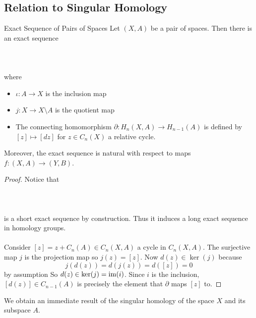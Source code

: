 \documentclass[a4paper]{article}
\begin{document}
\subsection{Relation to Singular Homology}
\begin{thm}{Exact Sequence of Pairs of Spaces}{} Let $(X,A)$ be a pair of spaces. Then there is an exact sequence \\~\\
\\~\\
where 
\begin{itemize}
\item $\iota:A\to X$ is the inclusion map
\item $j:X\to X\setminus A$ is the quotient map
\item The connecting homomorphism $\partial:H_n(X,A)\to H_{n-1}(A)$ is defined by $[z]\mapsto[dz]$ for $z\in C_n(X)$ a relative cycle. 
\end{itemize}
Moreover, the exact sequence is natural with respect to maps $f:(X,A)\to(Y,B)$. \tcbline
\begin{proof}
Notice that \\~\\
\\~\\
is a short exact sequence by construction. Thus it induces a long exact sequence in homology groups. \\~\\

Consider $[z]=z+C_n(A)\in C_n(X,A)$ a cycle in $C_n(X,A)$. The surjective map $j$ is the projection map so $j(z)=[z]$. Now $d(z)\in\ker(j)$ because $$j(d(z))=d(j(z))=d([z])=0$$ by assumption So $d(z)\in\ker(j)=\operatorname{im}(i)$. Since $i$ is the inclusion, $[d(z)]\in C_{n-1}(A)$ is precisely the element that $\partial$ maps $[z]$ to. 
\end{proof}
\end{thm}

We obtain an immediate result of the singular homology of the space $X$ and its subspace $A$. 
\end{document}
